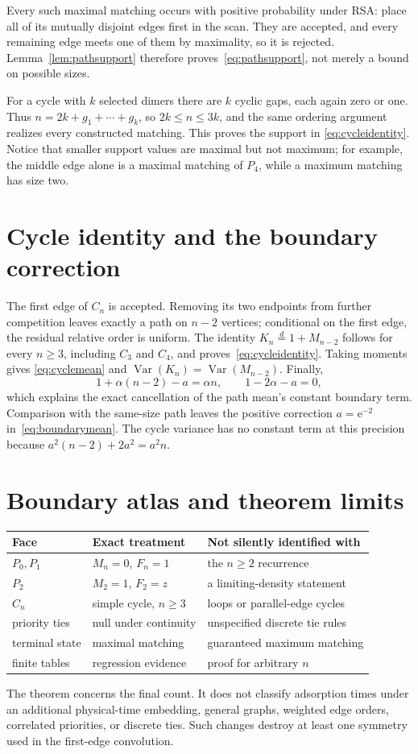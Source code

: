 \documentclass[10pt]{article}
\newcommand{\Var}{\operatorname{Var}}
\newcommand{\e}{\mathrm e}
\begin{document}
Every such maximal matching occurs with positive probability under RSA:
place all of its mutually disjoint edges first in the scan.  They are accepted,
and every remaining edge meets one of them by maximality, so it is rejected.
Lemma~\ref{lem:pathsupport} therefore proves~\eqref{eq:pathsupport}, not merely
a bound on possible sizes.

For a cycle with $k$ selected dimers there are $k$ cyclic gaps, each again zero
or one.  Thus $n=2k+g_1+\cdots+g_k$, so $2k\le n\le3k$, and the same ordering
argument realizes every constructed matching.  This proves the support in
\eqref{eq:cycleidentity}.  Notice that smaller support values are maximal but
not maximum; for example, the middle edge alone is a maximal matching of
$P_4$, while a maximum matching has size two.

\section{Cycle identity and the boundary correction}
The first edge of $C_n$ is accepted.  Removing its two endpoints from further
competition leaves exactly a path on $n-2$ vertices; conditional on the first
edge, the residual relative order is uniform.  The identity
$K_n\stackrel d=1+M_{n-2}$ follows for every $n\ge3$, including $C_3$ and
$C_4$, and proves~\eqref{eq:cycleidentity}.  Taking moments gives
\eqref{eq:cyclemean} and
$\Var(K_n)=\Var(M_{n-2})$.  Finally,
\[
 1+\alpha(n-2)-a=\alpha n,
 \qquad 1-2\alpha-a=0,
\]
which explains the exact cancellation of the path mean's constant boundary
term.  Comparison with the same-size path leaves the positive correction
$a=\e^{-2}$ in~\eqref{eq:boundarymean}.  The cycle variance has no constant
term at this precision because
$a^2(n-2)+2a^2=a^2n$.

\section{Boundary atlas and theorem limits}
\begin{center}
\small
\begin{tabular}{@{}lll@{}}
\toprule
Face & Exact treatment & Not silently identified with \\
\midrule
$P_0,P_1$ & $M_n=0$, $F_n=1$ & the $n\ge2$ recurrence \\
$P_2$ & $M_2=1$, $F_2=z$ & a limiting-density statement \\
$C_n$ & simple cycle, $n\ge3$ & loops or parallel-edge cycles \\
priority ties & null under continuity & unspecified discrete tie rules \\
terminal state & maximal matching & guaranteed maximum matching \\
finite tables & regression evidence & proof for arbitrary $n$ \\
\bottomrule
\end{tabular}
\end{center}
The theorem concerns the final count.  It does not classify adsorption times
under an additional physical-time embedding, general graphs, weighted edge
orders, correlated priorities, or discrete ties.  Such changes destroy at
least one symmetry used in the first-edge convolution.
\fi
\end{document}
